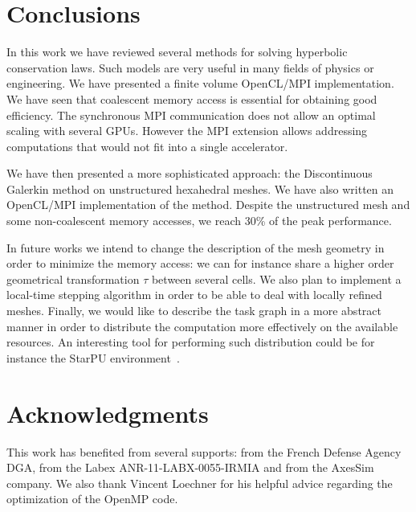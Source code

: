 \documentclass{svmult}
\begin{document}
\section{Conclusions}
In this work we have reviewed several methods for solving hyperbolic
conservation laws. Such models are very useful in many fields of
physics or engineering.  We have presented a finite volume OpenCL/MPI
implementation. We have seen that coalescent memory access is
essential for obtaining good efficiency. The synchronous MPI
communication does not allow an optimal scaling with several
GPUs. However the MPI extension allows addressing computations that
would not fit into a single accelerator.

We have then presented a more sophisticated approach: the
Discontinuous Galerkin method on unstructured hexahedral meshes. We
have also written an OpenCL/MPI implementation of the method. Despite
the unstructured mesh and some non-coalescent memory accesses, we
reach 30\% of the peak performance.

In future works we intend to change the description of the mesh
geometry in order to minimize the memory access: we can for instance
share a higher order geometrical transformation $\tau$ between several
cells. We also plan to implement a local-time stepping algorithm in
order to be able to deal with locally refined meshes.  Finally, we
would like to describe the task graph in a more abstract manner in
order to distribute the computation more effectively on the available
resources. An interesting tool for performing such distribution could
be for instance the StarPU environment~\cite{augonnet2011starpu}.


\section{Acknowledgments}
This work has benefited from several supports: from the French Defense
Agency DGA, from the Labex ANR-11-LABX-0055-IRMIA and from the AxesSim
company.  We also thank Vincent Loechner for his helpful advice
regarding the optimization of the OpenMP code.

%

%
%
\end{document}
